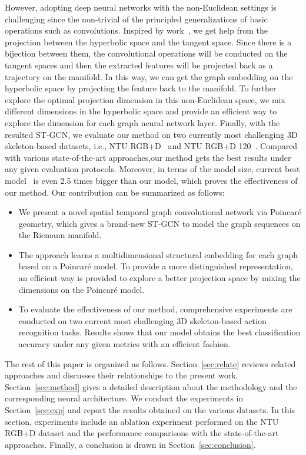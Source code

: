 \documentclass[letterpaper]{article} \usepackage{aaai19}  \usepackage{times}  \usepackage{helvet} \usepackage{courier}  \usepackage[hyphens]{url}  \usepackage{graphicx} \urlstyle{rm} \def\UrlFont{\rm}  \usepackage{graphicx}  \frenchspacing  \setlength{\pdfpagewidth}{8.5in}  \setlength{\pdfpageheight}{11in}
\begin{document}
However, adopting deep neural networks with the non-Euclidean settings is challenging since the non-trivial of the principled generalizations of basic operations such as convolutions. Inspired by work~\cite{gulcehre2018hyperbolic}, we get help from the projection between the hyperbolic space and the tangent space. Since there is a bijection between them, the convolutional operations will be conducted on the tangent spaces and then the extracted features will be projected back as a trajectory on the manifold. In this way, we can get the graph embedding on the hyperbolic space by projecting the feature back to the manifold. To further explore the optimal projection dimension in this non-Euclidean space, we mix different dimensions in the hyperbolic space and provide an efficient way to explore the dimension for each graph neural network layer. Finally, with the resulted ST-GCN, we evaluate our method on two currently most challenging 3D skeleton-based datasets, i.e., NTU RGB+D~\cite{shahroudy2016ntu} and NTU RGB+D 120~\cite{liu2019ntu}. Compared with various state-of-the-art approaches,our method gets the best results under any given evaluation protocols. Moreover, in terms of the model size, current best model~\cite{peng2020learning} is even 2.5 times bigger than our model, which proves the effectiveness of our method.
Our contribution can be summarized as follows:
\begin{itemize}
    \item We present a novel spatial temporal graph convolutional network via Poincar\'e geometry, which gives a brand-new ST-GCN to model the graph sequences on the Riemann manifold.
    \item The approach learns a multidimensional structural embedding for each graph based on a Poincar\'e model. To provide a more distinguished representation, an efficient way is provided to explore a better projection space by mixing the dimensions on the Poincar\'e model.
    \item To evaluate the effectiveness of our method, comprehensive experiments are conducted on two current most challenging 3D skeleton-based action recognition tasks. Results shows that our model obtains the best classification accuracy under any given metrics with an efficient fashion.
\end{itemize}

The rest of this paper is organized as follows. Section~\ref{sec:relate} reviews related approaches and discusses their relationships to the present work. Section~\ref{sec:method} gives a detailed description about the methodology and the corresponding neural architecture. We conduct the experiments in Section~\ref{sec:exp} and report the results obtained on the various datasets. In this section, experiments include an ablation experiment performed on the NTU RGB+D dataset and the performance comparisons with the state-of-the-art approaches. Finally, a conclusion is drawn in Section~\ref{sec:conclusion}.
\end{document}
